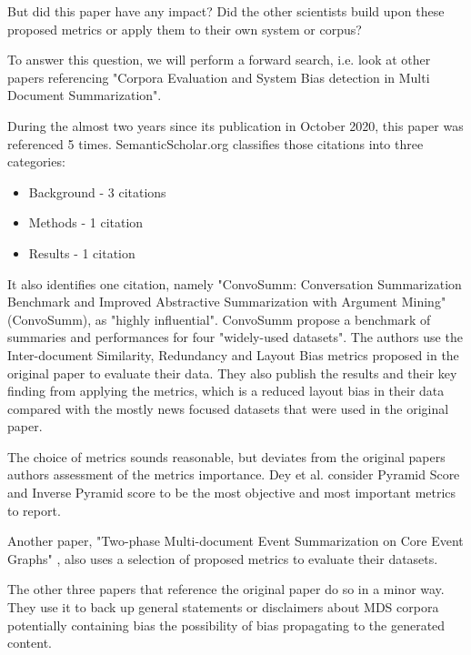 \documentclass[20_original-paper.tex]{subfiles}
\begin{document}

But did this paper have any impact? Did the other scientists build upon these proposed metrics or apply them to their own system or corpus?

To answer this question, we will perform a forward search, i.e. look at other papers referencing "Corpora Evaluation and System Bias detection in Multi Document Summarization".

During the almost two years since its publication in October 2020, this paper was referenced 5 times. SemanticScholar.org classifies those citations into three categories: \cite{Cohan2019StructuralSF}

\begin{itemize}
    \item Background - 3 citations
    \item Methods - 1 citation
    \item Results - 1 citation
\end{itemize}

It also identifies one citation, namely "ConvoSumm: Conversation Summarization Benchmark and Improved Abstractive Summarization with Argument Mining" (ConvoSumm)\cite{Fabbri2021ConvoSummCS},
as "highly influential"\cite{Valenzuela2015IdentifyingMC}.
ConvoSumm propose a benchmark of summaries and performances for four "widely-used datasets".
The authors use the Inter-document Similarity, Redundancy and Layout Bias metrics proposed in the original paper to evaluate their data.
They also publish the results and their key finding from applying the metrics, which is a reduced layout bias in their data compared with the mostly news focused datasets that were used in the original paper.

The choice of metrics sounds reasonable, but deviates from the original papers authors assessment of the metrics importance.
Dey et al. consider Pyramid Score and Inverse Pyramid score to be the most objective and most important metrics to report.\cite{dey-etal-2020-corpora}

Another paper, "Two-phase Multi-document Event Summarization on Core Event Graphs" \cite{Chen2022TwophaseME}, also uses a selection of proposed metrics to evaluate their datasets.

The other three papers that reference the original paper do so in a minor way.
They use it to back up general statements or disclaimers about MDS corpora potentially containing bias the possibility of bias propagating to the generated content. \cite{Moro2022SemanticSF,Adams2021WhatsIA,Counseling}
\end{document}
